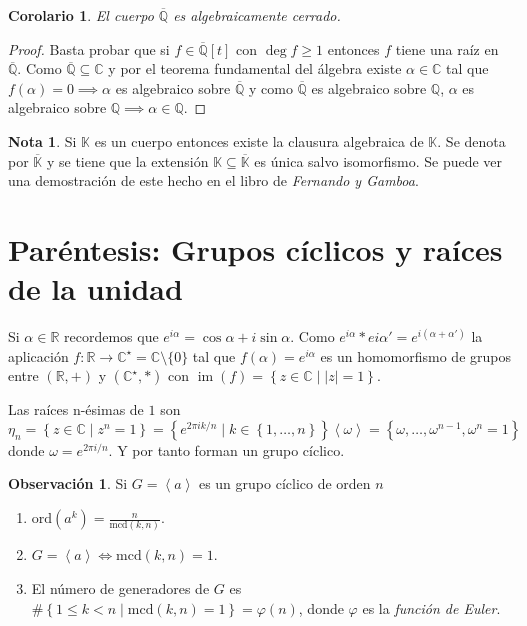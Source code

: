 \documentclass[10pt, spanish]{report}
\newtheorem{cor}{Corolario}[tma]
\theoremstyle{definition}
\newtheorem*{obs}{Observación}
\newtheorem*{nota}{Nota}
\newcommand{\Q}{\mathbb{Q}}
\newcommand{\R}{\mathbb{R}}
\newcommand{\C}{\mathbb{C}}
\newcommand{\K}{\mathbb{K}}
\newcommand{\im}[1]{\operatorname{im}\left(#1\right)}
\newcommand{\ord}[1]{\text{ord}(#1)}
\newcommand{\mcd}[1]{\text{mcd}(#1)}
\renewcommand{\geq}{\geqslant}
\renewcommand{\leq}{\leqslant}
\begin{document}
\begin{cor}
    El cuerpo $\overline{\Q}$ es algebraicamente cerrado.
\end{cor}

\begin{proof}
    Basta probar que si $f\in\overline{\Q}[t]$ con $\deg{f}\geq1$ entonces $f$
    tiene una raíz en $\overline{\Q}$. Como $\overline{\Q}\subseteq\C$ y por el
    teorema fundamental del álgebra existe $\alpha\in\C$ tal que $f(\alpha)=0
    \implies\alpha$ es algebraico sobre $\overline{\Q}$ y como $\overline{\Q}$
    es algebraico sobre $\Q$, $\alpha$ es algebraico sobre $\Q \implies
    \alpha\in\Q$.
\end{proof}

\begin{nota}
    Si $\K$ es un cuerpo entonces existe la clausura algebraica de $\K$. Se
    denota por $\overline{\K}$ y se tiene que la extensión $\K\subseteq
    \overline{\K}$ es única salvo isomorfismo. Se puede ver una demostración de
    este hecho en el libro de \textit{Fernando y Gamboa}.
\end{nota}

\section{Paréntesis: Grupos cíclicos y raíces de la unidad}

Si $\alpha\in\R$ recordemos que $e^{i\alpha}=\cos{\alpha}+i\sin{\alpha}$. Como
$e^{i\alpha}*e{i\alpha'}=e^{i(\alpha+\alpha')}$ la aplicación
$f:\R\to\C^\star=\C\setminus\{0\}$ tal que $f(\alpha)=e^{i\alpha}$ es un
homomorfismo de grupos entre $(\R,+)$ y $(\C^\star,*)$ con $\im{f}=\left\{ z\in
\C\mid \left| z \right| = 1 \right\}$.

Las raíces n-ésimas de $1$ son \[\eta_n=\left\{ z\in \C\mid z^n=1 \right\} =
\left\{ e^{2\pi ik/n}\mid k\in\left\{1,\ldots,n\right\}\right\}\left< \omega
\right> = \left\{ \omega,\ldots,\omega^{n-1},\omega^n=1 \right\}\]
donde $\omega = e^{2\pi i /n}$. Y por tanto forman un grupo cíclico.

\begin{obs}
    Si $G= \left< a \right>$ es un grupo cíclico de orden $n$
    \begin{enumerate}
        \item $\ord{a^k}=\frac{n}{\mcd{k,n}}$.
        \item $G= \left< a \right> \Leftrightarrow \mcd{k,n}=1$.
        \item El número de generadores de $G$ es $\#\left\{ 1\leq k<
            n\mid\mcd{k,n}=1 \right\}=\varphi(n)$, donde $\varphi$ es la
            \textit{función de Euler}.
    \end{enumerate}
\end{obs}
\end{document}
